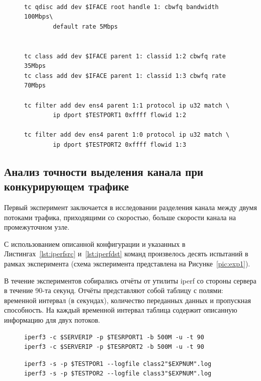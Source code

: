         \begin{figure}[ht!]
    		\center
    		\begin{lstlisting}[frame=lines,
    						  caption={Список команд для конфигурации дисциплины обслуживания CBWFQ.},
    						  label={lst:tccmd},
    						  style=tcstyle]

tc qdisc add dev $IFACE root handle 1: cbwfq bandwidth 100Mbps\
        default rate 5Mbps


tc class add dev $IFACE parent 1: classid 1:2 cbwfq rate 35Mbps
tc class add dev $IFACE parent 1: classid 1:3 cbwfq rate 70Mbps

tc filter add dev ens4 parent 1:1 protocol ip u32 match \
        ip dport $TESTPORT1 0xffff flowid 1:2

tc filter add dev ens4 parent 1:0 protocol ip u32 match \
        ip dport $TESTPORT2 0xffff flowid 1:3
    		\end{lstlisting}
        \end{figure}

		\subsection{Анализ точности выделения канала при конкурирующем трафике}
			
			Первый эксперимент заключается в исследовании разделения канала между
			двумя потоками трафика, приходящими со скоростью, больше скорости канала на
			промежуточном узле.

    		С использованием описанной конфигурации и указанных в Листингах~\ref{lst:iperfsrc} и~\ref{lst:iperfdst}
			команд произвелось десять испытаний в рамках эксперимента (схема
			эксперимента представлена на Рисунке~\ref{pic:exp1}).

    		В течение экспериментов собирались отчёты от утилиты iperf со стороны сервера в
    		течение 90-та секунд. Отчёты представляют собой таблицу с полями:
			временной интервал (в секундах), количество переданных данных и пропускная способность.
			На каждый временной интервал таблица содержит описанную информацию для двух потоков.

        \begin{figure}[ht!]
    		\center
    		\begin{lstlisting}[frame=lines,
    						  caption={Команда iperf на узле-источнике (клиентская сторона).},
    						  label={lst:iperfsrc}]
iperf3 -c $SERVERIP -p $TESRPORT1 -b 500M -u -t 90
iperf3 -c $SERVERIP -p $TESRPORT2 -b 500M -u -t 90
    		\end{lstlisting}
        \end{figure}	
        \begin{figure}[ht!]
    		\center
    		\begin{lstlisting}[frame=lines,
    						  caption={Команда iperf на узле-цели (серверная сторона).},
    						  label={lst:iperfdst}]
iperf3 -s -p $TESTPOR1 --logfile class2"$EXPNUM".log
iperf3 -s -p $TESTPOR2 --logfile class3"$EXPNUM".log
    		\end{lstlisting}
        \end{figure}


